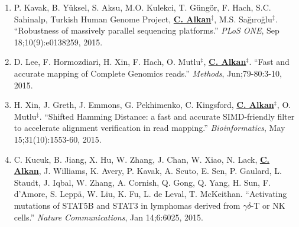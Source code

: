 \begin{enumerate}[i)]
\begin{enumerate}
  \item        
   P. Kavak, B. Yüksel, S. Aksu, M.O. Kulekci, T. Güngör, F. Hach, S.C. Sahinalp, Turkish Human Genome Project, {\bf {\underline {C. Alkan}}}$^\ddag$,
  M.S. Sağıroğlu$^\ddag$.    
  ``Robustness of massively parallel sequencing platforms.''
 {\em PLoS ONE},  Sep 18;10(9):e0138259, 2015.  

  \item        
  D. Lee, F. Hormozdiari, H. Xin, F. Hach, O. Mutlu$^\ddag$,  {\bf {\underline {C. Alkan}}}$^\ddag$.
  ``Fast and accurate mapping of Complete Genomics reads.''
  {\em Methods}, Jun;79-80:3-10, 2015. 

  \item        
 H. Xin, J. Greth, J. Emmons, G. Pekhimenko, C. Kingsford, {\bf {\underline{C. Alkan}}}$^\ddag$,  O. Mutlu$^\ddag$. 
 ``Shifted Hamming Distance: a fast and accurate SIMD-friendly filter to accelerate alignment verification in read mapping.''
{\em Bioinformatics},  May 15;31(10):1553-60, 2015.

  \item        
   C. Kucuk, B. Jiang, X. Hu, W. Zhang, J. Chan, W. Xiao, N. Lack,   {\bf {\underline {C. Alkan}}},  J. Williams, K. Avery, P. Kavak, A. Scuto, E. Sen,  P. Gaulard, L. Staudt, J. Iqbal,  W. Zhang,  A. Cornish, Q. Gong, Q.  Yang, H. Sun, F. d'Amore, S. Leppä, W. Liu, K. Fu, L. de Leval, T. McKeithan.
   ``Activating mutations of STAT5B and STAT3 in lymphomas derived from $\gamma\delta$-T or NK cells.''
 {\em Nature Communications}, Jan 14;6:6025, 2015.


\end{enumerate}


\end{enumerate}

